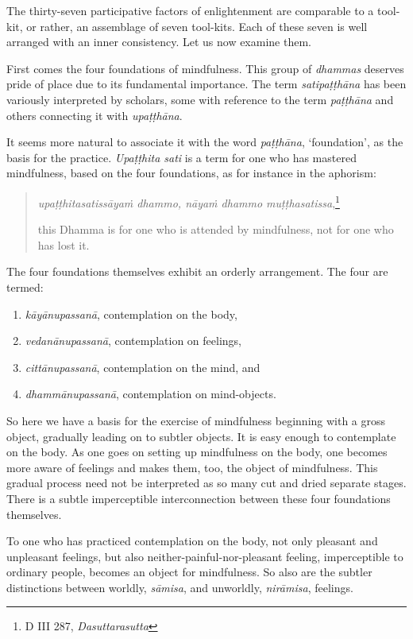 The thirty-seven participative factors of enlightenment are comparable to a tool-kit, or rather, an assemblage of seven tool-kits. Each of these seven is well arranged with an inner consistency. Let us now examine them.

First comes the four foundations of mindfulness. This group of \emph{dhammas} deserves pride of place due to its fundamental importance. The term \emph{satipaṭṭhāna} has been variously interpreted by scholars, some with reference to the term \emph{paṭṭhāna} and others connecting it with \emph{upaṭṭhāna}.

It seems more natural to associate it with the word \emph{paṭṭhāna}, `foundation', as the basis for the practice. \emph{Upaṭṭhita sati} is a term for one who has mastered mindfulness, based on the four foundations, as for instance in the aphorism:

\begin{quote}
\emph{upaṭṭhitasatissāyaṁ dhammo, nāyaṁ dhammo muṭṭhasatissa},\footnote{D III 287, \emph{Dasuttarasutta}}

this Dhamma is for one who is attended by mindfulness, not for one who has lost it.
\end{quote}

The four foundations themselves exhibit an orderly arrangement. The four are termed:

\begin{enumerate}
\def\labelenumi{\arabic{enumi}.}
\tightlist
\item
  \emph{kāyānupassanā}, contemplation on the body,
\item
  \emph{vedanānupassanā}, contemplation on feelings,
\item
  \emph{cittānupassanā}, contemplation on the mind, and
\item
  \emph{dhammānupassanā}, contemplation on mind-objects.
\end{enumerate}

So here we have a basis for the exercise of mindfulness beginning with a gross object, gradually leading on to subtler objects. It is easy enough to contemplate on the body. As one goes on setting up mindfulness on the body, one becomes more aware of feelings and makes them, too, the object of mindfulness. This gradual process need not be interpreted as so many cut and dried separate stages. There is a subtle imperceptible interconnection between these four foundations themselves.

To one who has practiced contemplation on the body, not only pleasant and unpleasant feelings, but also neither-painful-nor-pleasant feeling, imperceptible to ordinary people, becomes an object for mindfulness. So also are the subtler distinctions between worldly, \emph{sāmisa}, and unworldly, \emph{nirāmisa}, feelings.

